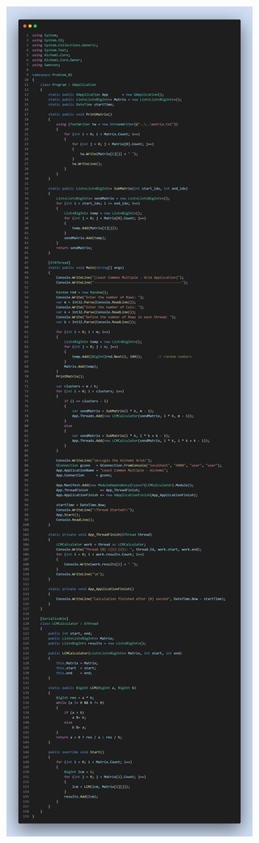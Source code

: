 \documentclass[12pt,a4paper]{report}
\begin{document}
\begin{center}
\clearpage
\includegraphics[trim=0in 28.2in 0in 21.25in, clip, scale=.23]{./Figures/Problem_02/Problem_02}
\clearpage

\end{center}
\end{document}
